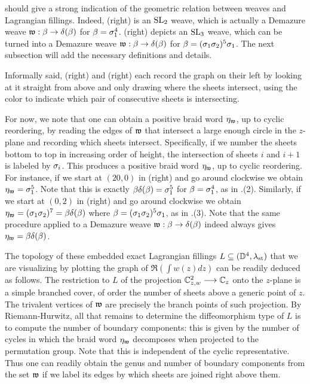 \noindent {} should give a strong indication of the geometric relation between weaves and Lagrangian fillings. Indeed,  (right) is an $\operatorname{SL}_2$ weave, which is actually a Demazure weave $\mathfrak{w}:\beta\to\delta(\beta)$ for $\beta=\sigma_1^4$.  (right) depicts an $\operatorname{SL}_3$ weave, which can be turned into a Demazure weave $\mathfrak{w}:\beta\to\delta(\beta)$ for $\beta=(\sigma_1\sigma_2)^5\sigma_1$. The next subsection will add the necessary definitions and details.\\

\begin{remark}
Informally said,  (right) and  (right) each record the graph on their left by looking at it straight from above and only drawing where the sheets intersect, using the color to indicate which pair of consecutive sheets is intersecting.\sbs
\end{remark}

For now, we note that one can obtain a positive braid word $\eta_{\mathfrak{w}}$, up to cyclic reordering, by reading the edges of $\mathfrak{w}$ that intersect a large enough circle in the $z$-plane and recording which sheets intersect. Specifically, if we number the sheets bottom to top in increasing order of height, the intersection of sheets $i$ and $i+1$ is labeled by $\sigma_i$. This produces a positive braid word $\eta_{\mathfrak{w}}$, up to cyclic reordering. For instance, if we start at $(20,0)$ in  (right) and go around clockwise we obtain $\eta_{\mathfrak{w}}=\sigma_1^5$. Note that this is exactly $\beta\delta(\beta)=\sigma_1^5$ for $\beta=\sigma_1^4$, as in .(2). Similarly, if we start at $(0,2)$ in  (right) and go around clockwise we obtain $\eta_{\mathfrak{w}}=(\sigma_1\sigma_2)^7=\beta\delta(\beta)$ where $\beta=(\sigma_1\sigma_2)^5\sigma_1$, as in .(3). Note that the same procedure applied to a Demazure weave $\mathfrak{w}:\beta\to\delta(\beta)$ indeed always gives $\eta_{\mathfrak{w}}=\beta\delta(\beta)$.

\begin{remark}\label{rmk:topology_Lagrangian_filling}
The topology of these embedded exact Lagrangian fillings $L\subseteq(\mathbb{D}^4,\lambda_{\text{st}})$ that we are visualizing by plotting the graph of $\Re\left(\int w(z)dz\right)$ can be readily deduced as follows. The restriction to $L$ of the projection $\mathbb{C}^2_{z,w}\longrightarrow\mathbb{C}_z$ onto the $z$-plane is a simple branched cover, of order the number of sheets above a generic point of $z$. The trivalent vertices of $\mathfrak{w}$ are precisely the branch points of such projection. By Riemann-Hurwitz, all that remains to determine the diffeomorphism type of $L$ is to compute the number of boundary components: this is given by the number of cycles in which the braid word $\eta_{\mathfrak{w}}$ decomposes when projected to the permutation group. Note that this is independent of the cyclic representative. Thus one can readily obtain the genus and number of boundary components from the set $\mathfrak{w}$ if we label its edges by which sheets are joined right above them.\sbs
\end{remark}

